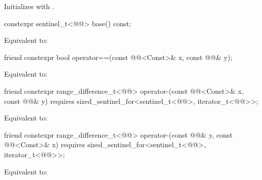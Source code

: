 \begin{itemdescr}
\pnum
\effects
Initializes  with .
\end{itemdescr}

\begin{itemdecl}
constexpr sentinel_t<@@> base() const;
\end{itemdecl}

\begin{itemdescr}
\pnum
\effects
Equivalent to: 
\end{itemdescr}

\begin{itemdecl}
friend constexpr bool operator==(const @@<Const>& x, const @@& y);
\end{itemdecl}

\begin{itemdescr}
\pnum
\effects
Equivalent to: 
\end{itemdescr}

%
\begin{itemdecl}
friend constexpr range_difference_t<@@>
  operator-(const @@<Const>& x, const @@& y)
    requires sized_sentinel_for<sentinel_t<@@>, iterator_t<@@>>;
\end{itemdecl}

\begin{itemdescr}
\pnum
\effects
Equivalent to: 
\end{itemdescr}

%
\begin{itemdecl}
friend constexpr range_difference_t<@@>
  operator-(const @@& y, const @@<Const>& x)
    requires sized_sentinel_for<sentinel_t<@@>, iterator_t<@@>>;
\end{itemdecl}

\begin{itemdescr}
\pnum
\effects
Equivalent to: 
\end{itemdescr}

